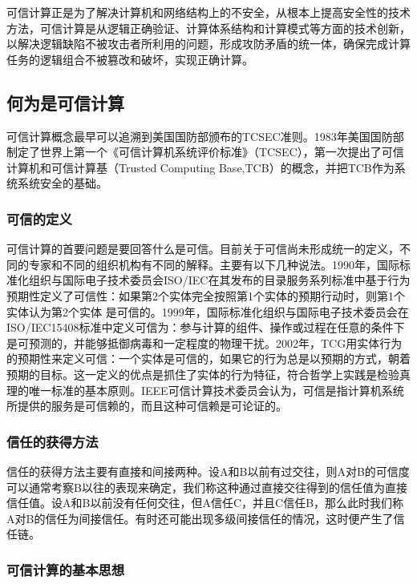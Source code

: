 可信计算正是为了解决计算机和网络结构上的不安全，从根本上提高安全性的技术方法，可信计算是从逻辑正确验证、计算体系结构和计算模式等方面的技术创新，以解决逻辑缺陷不被攻击者所利用的问题，形成攻防矛盾的统一体，确保完成计算任务的逻辑组合不被篡改和破坏，实现正确计算。

\subsection{何为是可信计算}

可信计算概念最早可以追溯到美国国防部颁布的TCSEC准则。1983年美国国防部制定了世界上第一个《可信计算机系统评价标准》（TCSEC），第一次提出了可信计算机和可信计算基（Trusted Computing Base,TCB）的概念，并把TCB作为系统系统安全的基础。

\subsubsection{可信的定义}

可信计算的首要问题是要回答什么是可信。目前关于可信尚未形成统一的定义，不同的专家和不同的组织机构有不同的解释。主要有以下几种说法。1990年，国际标准化组织与国际电子技术委员会ISO/IEC在其发布的目录服务系列标准中基于行为预期性定义了可信性：如果第2个实体完全按照第1个实体的预期行动时，则第1个实体认为第2个实体 是可信的。1999年，国际标准化组织与国际电子技术委员会在ISO/IEC15408标准中定义可信为：参与计算的组件、操作或过程在任意的条件下是可预测的，并能够抵御病毒和一定程度的物理干扰。2002年，TCG用实体行为的预期性来定义可信：一个实体是可信的，如果它的行为总是以预期的方式，朝着预期的目标。这一定义的优点是抓住了实体的行为特征，符合哲学上实践是检验真理的唯一标准的基本原则。IEEE可信计算技术委员会认为，可信是指计算机系统所提供的服务是可信赖的，而且这种可信赖是可论证的。

\subsubsection{信任的获得方法}

信任的获得方法主要有直接和间接两种。设A和B以前有过交往，则A对B的可信度可以通常考察B以往的表现来确定，我们称这种通过直接交往得到的信任值为直接信任值。设A和B以前没有任何交往，但A信任C，并且C信任B，那么此时我们称A对B的信任为间接信任。有时还可能出现多级间接信任的情况，这时便产生了信任链。

\subsubsection{可信计算的基本思想}

